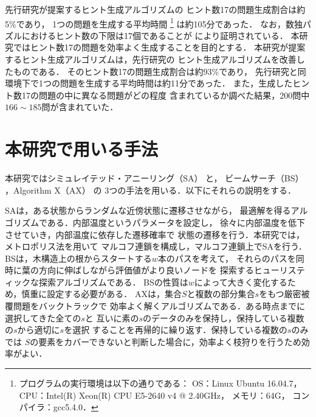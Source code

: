 \documentclass[a4paper, 9pt]{jarticle}
\begin{document}
\begin{論文概要}
先行研究が提案するヒント生成アルゴリズムの
ヒント数17の問題生成割合は約5\%であり，
1つの問題を生成する平均時間
\footnote{プログラムの実行環境は以下の通りである： 
OS：Linux Ubuntu 16.04.7，
CPU：Intel(R) Xeon(R) CPU E5-2640 v4 @ 2.40GHz，
メモリ：64G，
コンパイラ：gcc5.4.0．
}
は約105分であった．
なお，数独パズルにおけるヒント数の下限は17個であることが 
\cite{seventeen_hints} により証明されている．
本研究ではヒント数17の問題を効率よく生成することを目的とする．
本研究が提案するヒント生成アルゴリズムは，先行研究の
ヒント生成アルゴリズムを改善したものである．
そのヒント数17の問題生成割合は約93\%であり，
先行研究と同環境下で1つの問題を生成する平均時間は約11分であった．
また，生成したヒント数17の問題の中に異なる問題がどの程度
含まれているか調べた結果，200問中$166 \sim 185$問が含まれていた．

\section{本研究で用いる手法}
本研究ではシミュレイテッド・アニーリング（SA） \cite{sa} と，
ビームサーチ（BS） \cite{beam_search}，Algorithm X（AX） \cite{AX} の
3つの手法を用いる．以下にそれらの説明をする．

SAは，ある状態からランダムな近傍状態に遷移させながら，
最適解を得るアルゴリズムである．内部温度というパラメータを設定し，
徐々に内部温度を低下させていき，内部温度に依存した遷移確率で
状態の遷移を行う．本研究では，メトロポリス法を用いて
マルコフ連鎖を構成し，マルコフ連鎖上でSAを行う．
BSは，木構造上の根からスタートする$w$本のパスを考えて，
それらのパスを同時に葉の方向に伸ばしながら評価値がより良いノードを
探索するヒューリスティックな探索アルゴリズムである．
BSの性質は$w$によって大きく変化するため，慎重に設定する必要がある．
AXは，集合$S$と複数の部分集合$s$をもつ厳密被覆問題をバックトラックで
効率よく解くアルゴリズムである．ある時点までに選択してきた全ての$s$と
互いに素の$s$のデータのみを保持し，保持している複数の$s$から適切に$s$を選択
することを再帰的に繰り返す．保持している複数の$s$のみでは
$S$の要素をカバーできないと判断した場合に，効率よく枝狩りを行うため効率がよい．


\end{論文概要}
\end{document}
